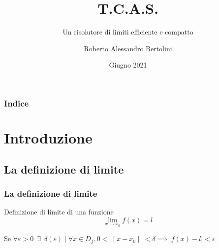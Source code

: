 \documentclass{beamer}
\title{T.C.A.S.}
\author[Roberto Bertolini]{Roberto Alessandro Bertolini}
\institute[Liceo Nervi Ferrari]{Liceo "P. Nervi - G. Ferrari" - Morbegno}
\date{Giugno 2021}
\subtitle{Un risolutore di limiti efficiente e compatto}
\begin{document}
	
	\begin{frame}
		\titlepage
	\end{frame}
	
	\begin{frame}
		\frametitle{Indice}
		\tableofcontents
	\end{frame}
	
	\section{Introduzione}
	
	\subsection{La definizione di limite}
	\begin{frame}
		\frametitle{La definizione di limite}
		\begin{block}{Definizione di limite di una funzione}
			\[ 
			\lim_{x \to x_{0}}{f(x) = l} 
			\]
			
			Se \( 
			\forall \varepsilon > 0 \enspace \exists \enspace \delta(\varepsilon) \mid \forall x \in D_{f}, 0 < \: \mid x - x_{0} \mid \: <\delta \implies \mid f(x) - l \mid < \varepsilon
			\)
		\end{block}
		
	\end{frame}
	
\end{document}
